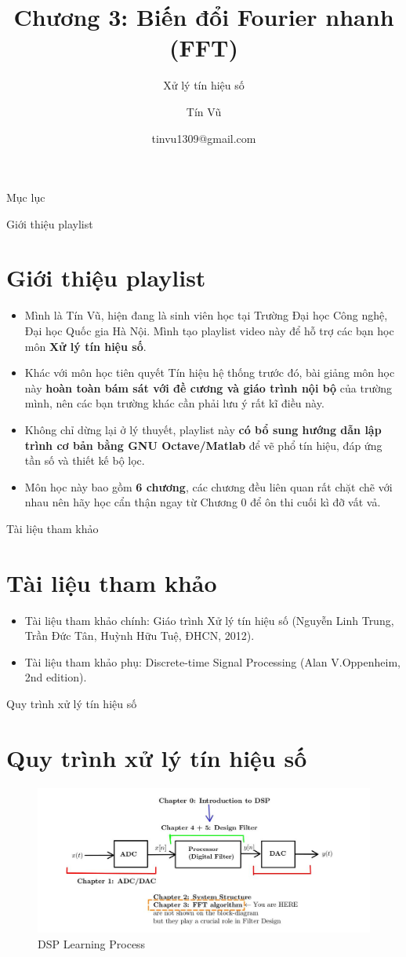 \documentclass[8pt]{beamer}
\title[Chương 3: Biến đổi Fourier nhanh (FFT)] %
{Chương 3: Biến đổi Fourier nhanh (FFT)}
\subtitle{Xử lý tín hiệu số}
\author[Xử lý tín hiệu số] %
{Tín Vũ}
\date[VLC 2021] %
{tinvu1309@gmail.com}
\begin{document}
\frame{\titlepage}
\begin{frame}{Mục lục}
\tableofcontents
\end{frame}
\begin{frame}{Giới thiệu playlist}
\section{Giới thiệu playlist}
	\begin{itemize}
		\item Mình là Tín Vũ, hiện đang là sinh viên học tại Trường Đại học Công nghệ, Đại học Quốc gia Hà Nội. Mình tạo playlist video này để hỗ trợ các bạn học môn \textbf{Xử lý tín hiệu số}.
\item Khác với môn học tiên quyết \alert{Tín hiệu hệ thống} trước đó, bài giảng môn học này \textbf{hoàn toàn bám sát với đề cương và giáo trình nội bộ} của trường mình, nên các bạn trường khác cần phải lưu ý rất kĩ điều này.
\item Không chỉ dừng lại ở lý thuyết, playlist này \textbf{có bổ sung hướng dẫn lập trình cơ bản bằng GNU Octave/Matlab} để vẽ phổ tín hiệu, đáp ứng tần số và thiết kế bộ lọc.
\item Môn học này bao gồm \textbf{6 chương}, các chương đều liên quan rất chặt chẽ với nhau nên hãy học cẩn thận ngay từ \alert{Chương 0} để ôn thi cuối kì đỡ vất vả.
	\end{itemize}
\end{frame}
\begin{frame}{Tài liệu tham khảo}
\section{Tài liệu tham khảo}
\begin{itemize}
		\item Tài liệu tham khảo chính: Giáo trình Xử lý tín hiệu số (Nguyễn Linh Trung, Trần Đức Tân, Huỳnh Hữu Tuệ, ĐHCN, 2012).
		\item Tài liệu tham khảo phụ: Discrete-time Signal Processing (Alan V.Oppenheim, 2nd edition). 
	\end{itemize}
\end{frame}
\begin{frame}{Quy trình xử lý tín hiệu số}
\section{Quy trình xử lý tín hiệu số}
\begin{figure}[h]
			\includegraphics[width=1.1\textwidth]{1.jpg}
			\caption{DSP Learning Process}			\label{fig:re1}
		\end{figure}

\end{frame}
\end{document}
